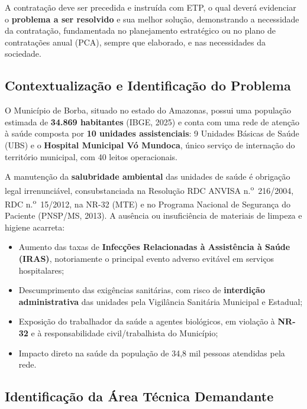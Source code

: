 \documentclass[12pt,a4paper]{article}
\newcommand{\art}[1]{art.\,#1}
\begin{document}
\begin{legalbox}[Base Legal --- \art{18}, I, Lei n.\textsuperscript{o} 14.133/2021]
\small
A contratação deve ser precedida e instruída com ETP, o qual deverá evidenciar o
\textbf{problema a ser resolvido} e sua melhor solução, demonstrando a necessidade
da contratação, fundamentada no planejamento estratégico ou no plano de contratações
anual (PCA), sempre que elaborado, e nas necessidades da sociedade.
\end{legalbox}

\subsection{Contextualização e Identificação do Problema}

O Município de Borba, situado no estado do Amazonas, possui uma população estimada de
\textbf{34.869 habitantes} (IBGE, 2025) e conta com uma rede de atenção à saúde composta
por \textbf{10 unidades assistenciais}: 9 Unidades Básicas de Saúde (UBS) e o
\textbf{Hospital Municipal Vó Mundoca}, único serviço de internação do território
municipal, com 40 leitos operacionais.

A manutenção da \textbf{salubridade ambiental} das unidades de saúde é obrigação legal
irrenunciável, consubstanciada na Resolução RDC ANVISA n.\textsuperscript{o}~216/2004,
RDC n.\textsuperscript{o}~15/2012, na NR-32 (MTE) e no Programa Nacional de Segurança
do Paciente (PNSP/MS, 2013). A ausência ou insuficiência de materiais de limpeza e
higiene acarreta:

\begin{itemize}
  \item Aumento das taxas de \textbf{Infecções Relacionadas à Assistência à Saúde
    (IRAS)}, notoriamente o principal evento adverso evitável em serviços hospitalares;
  \item Descumprimento das exigências sanitárias, com risco de \textbf{interdição
    administrativa} das unidades pela Vigilância Sanitária Municipal e Estadual;
  \item Exposição do trabalhador da saúde a agentes biológicos, em violação à
    \textbf{NR-32} e à responsabilidade civil/trabalhista do Município;
  \item Impacto direto na saúde da população de 34,8 mil pessoas atendidas pela rede.
\end{itemize}

\subsection{Identificação da Área Técnica Demandante}
\end{document}
